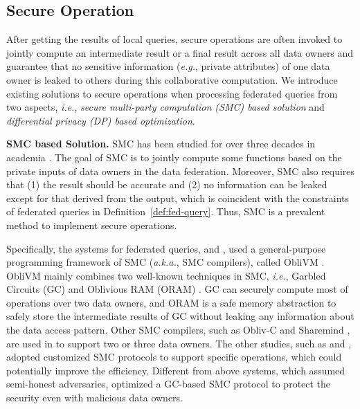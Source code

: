 \documentclass[11pt]{article}
\newcommand{\eg}{\textit{e.g.},\xspace}
\newcommand{\ie}{\textit{i.e.},\xspace}
\newcommand{\aka}{\textit{a.k.a.},\xspace}
\newcommand\defref[1]{Definition~\ref{#1}}
\newcommand{\fakeparagraph}[1]{\vspace{1mm}\noindent\textbf{#1.}}
\begin{document}
\subsection{Secure Operation}\label{sec:data-secure}

After getting the results of local queries, secure operations are often invoked to jointly compute an intermediate result or a final result across all data owners and guarantee that no sensitive information (\eg private attributes) of one data owner is leaked to others during this collaborative computation.
We introduce existing solutions to secure operations when processing federated queries from two aspects, \ie
\textit{secure multi-party computation (SMC) based solution} and \textit{differential privacy (DP) based optimization}.

\fakeparagraph{SMC based Solution}
SMC has been studied for over three decades in academia \cite{Yongxin-DBLP:journals/cacm/Lindell21}.
The goal of SMC is to jointly compute some functions based on the private inputs of data owners in the data federation.
Moreover, SMC also requires that (1) the result should be accurate and (2) no information can be leaked except for that derived from the output, which is coincident with the constraints of federated queries in \defref{def:fed-query}.
Thus, SMC is a prevalent method to implement secure operations.

Specifically, the systems for federated queries, \SMCQL \cite{Yongxin-ref_bater2017smcql} and \Shrinkwrap \cite{Yongxin-ref_bater2018shrinkwrap}, used a general-purpose programming framework of SMC (\aka SMC compilers), called ObliVM \cite{Yongxin-DBLP:conf/sp/LiuWNHS15}.
ObliVM mainly combines two well-known techniques in SMC, \ie Garbled Circuits (GC) \cite{Yongxin-DBLP:conf/focs/Yao82b} and Oblivious RAM (ORAM) \cite{Yongxin-DBLP:journals/jacm/GoldreichO96}.
GC can securely compute most of operations over two data owners, and ORAM is a safe memory abstraction to safely store the intermediate results of GC without leaking any information about the data access pattern.
Other SMC compilers, such as Obliv-C \cite{Yongxin-DBLP:journals/iacr/ZahurE15} and Sharemind \cite{Yongxin-DBLP:conf/esorics/BogdanovLW08}, are used in \Conclave \cite{Yongxin-ref_volgushev2019conclave} to support two or three data owners.
The other studies, such as \cite{Yongxin-ref_tong2022hu} and \cite{Yongxin-dasfaa23aknn}, adopted customized SMC protocols to support specific operations, which could potentially improve the efficiency.
Different from above systems, which assumed semi-honest adversaries, \Senate \cite{Yongxin-DBLP:conf/uss/PoddarKYDPH21} optimized a GC-based SMC protocol \cite{Yongxin-DBLP:conf/ccs/WangRK17a} to protect the security even with malicious data owners.
\end{document}
